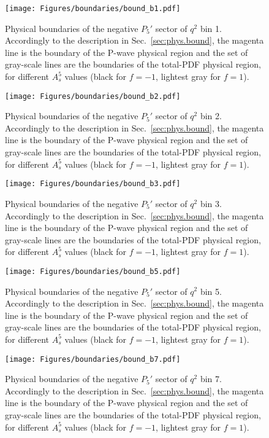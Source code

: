 \begin{figure}[!hbt]
  \centering
  \texttt{[image: Figures/boundaries/bound\_b1.pdf]}
  \caption{Physical boundaries of the negative $P_5'$ sector of $q^2$ bin 1. Accordingly to the description in Sec.~\ref{sec:phys.bound}, the magenta line is the boundary of the P-wave physical region and the set of gray-scale lines are the boundaries of the total-PDF physical region, for different $A_s^5$ values (black for $f=-1$, lightest gray for $f=1$).}
  \label{fig:bound1}
\end{figure}

\begin{figure}[!hbt]
  \centering
  \texttt{[image: Figures/boundaries/bound\_b2.pdf]}
  \caption{Physical boundaries of the negative $P_5'$ sector of $q^2$ bin 2. Accordingly to the description in Sec.~\ref{sec:phys.bound}, the magenta line is the boundary of the P-wave physical region and the set of gray-scale lines are the boundaries of the total-PDF physical region, for different $A_s^5$ values (black for $f=-1$, lightest gray for $f=1$).}
  \label{fig:bound2}
\end{figure}

\begin{figure}[!hbt]
  \centering
  \texttt{[image: Figures/boundaries/bound\_b3.pdf]}
  \caption{Physical boundaries of the negative $P_5'$ sector of $q^2$ bin 3. Accordingly to the description in Sec.~\ref{sec:phys.bound}, the magenta line is the boundary of the P-wave physical region and the set of gray-scale lines are the boundaries of the total-PDF physical region, for different $A_s^5$ values (black for $f=-1$, lightest gray for $f=1$).}
  \label{fig:bound3}
\end{figure}

\begin{figure}[!hbt]
  \centering
  \texttt{[image: Figures/boundaries/bound\_b5.pdf]}
  \caption{Physical boundaries of the negative $P_5'$ sector of $q^2$ bin 5. Accordingly to the description in Sec.~\ref{sec:phys.bound}, the magenta line is the boundary of the P-wave physical region and the set of gray-scale lines are the boundaries of the total-PDF physical region, for different $A_s^5$ values (black for $f=-1$, lightest gray for $f=1$).}
  \label{fig:bound5}
\end{figure}

\begin{figure}[!hbt]
  \centering
  \texttt{[image: Figures/boundaries/bound\_b7.pdf]}
  \caption{Physical boundaries of the negative $P_5'$ sector of $q^2$ bin 7. Accordingly to the description in Sec.~\ref{sec:phys.bound}, the magenta line is the boundary of the P-wave physical region and the set of gray-scale lines are the boundaries of the total-PDF physical region, for different $A_s^5$ values (black for $f=-1$, lightest gray for $f=1$).}
  \label{fig:bound7}
\end{figure}

